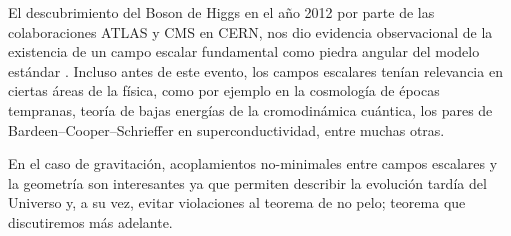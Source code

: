 \documentclass[../Main.tex]{subfiles}
\begin{document}
El descubrimiento del Boson de Higgs en el año 2012 por parte de las colaboraciones ATLAS y CMS en CERN, nos dio evidencia observacional de la existencia de un campo escalar fundamental como piedra angular del modelo estándar \cite{CMS:2012qbp,ATLAS:2012yve}. Incluso antes de este evento, los campos escalares tenían relevancia en ciertas áreas de la física, como por ejemplo en la cosmología de épocas tempranas, teoría de bajas energías de la cromodinámica cuántica, los pares de Bardeen–Cooper–Schrieffer en superconductividad, entre muchas otras.


En el caso de gravitación, acoplamientos no-minimales entre campos escalares y la geometría son interesantes ya que permiten describir la evolución tardía del Universo y, a su vez, evitar violaciones al teorema de no pelo; teorema que discutiremos más adelante. 
\end{document}
